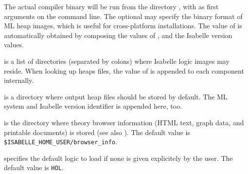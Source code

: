 \begin{isabellebody}
\begin{isamarkuptext}
\begin{description}
  The actual compiler binary will be run from the directory \hyperlink{setting.ML-HOME}{\mbox{}}, with \hyperlink{setting.ML-OPTIONS}{\mbox{}} as first arguments on the
  command line.  The optional \hyperlink{setting.ML-PLATFORM}{\mbox{}} may specify the
  binary format of ML heap images, which is useful for cross-platform
  installations.  The value of \hyperlink{setting.ML-IDENTIFIER}{\mbox{}} is
  automatically obtained by composing the values of \hyperlink{setting.ML-SYSTEM}{\mbox{}}, \hyperlink{setting.ML-PLATFORM}{\mbox{}} and the Isabelle version values.
  
  \item[\indexdef{}{setting}{ISABELLE\_PATH}\hypertarget{setting.ISABELLE-PATH}{\hyperlink{setting.ISABELLE-PATH}{\mbox{\isa{\isatt{ISABELLE{\isacharunderscore}PATH}}}}}] is a list of directories
  (separated by colons) where Isabelle logic images may reside.  When
  looking up heaps files, the value of \hyperlink{setting.ML-IDENTIFIER}{\mbox{}} is
  appended to each component internally.
  
  \item[\indexdef{}{setting}{ISABELLE\_OUTPUT}\hypertarget{setting.ISABELLE-OUTPUT}{\hyperlink{setting.ISABELLE-OUTPUT}{\mbox{\isa{\isatt{ISABELLE{\isacharunderscore}OUTPUT}}}}}\isa{{\isachardoublequote}\isactrlsup {\isacharasterisk}{\isachardoublequote}}] is a
  directory where output heap files should be stored by default. The
  ML system and Isabelle version identifier is appended here, too.
  
  \item[\indexdef{}{setting}{ISABELLE\_BROWSER\_INFO}\hypertarget{setting.ISABELLE-BROWSER-INFO}{\hyperlink{setting.ISABELLE-BROWSER-INFO}{\mbox{\isa{\isatt{ISABELLE{\isacharunderscore}BROWSER{\isacharunderscore}INFO}}}}}] is the directory where
  theory browser information (HTML text, graph data, and printable
  documents) is stored (see also ).  The default
  value is \verb|$ISABELLE_HOME_USER/browser_info|.
  
  \item[\indexdef{}{setting}{ISABELLE\_LOGIC}\hypertarget{setting.ISABELLE-LOGIC}{\hyperlink{setting.ISABELLE-LOGIC}{\mbox{\isa{\isatt{ISABELLE{\isacharunderscore}LOGIC}}}}}] specifies the default logic to
  load if none is given explicitely by the user.  The default value is
  \verb|HOL|.
  

\end{description}
\end{isamarkuptext}
\end{isabellebody}
